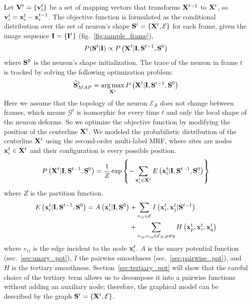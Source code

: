 \documentclass{article}
\DeclareMathOperator*{\argmax}{arg\,max}
\begin{document}
Let ${\bf V}^t = \{{\bf v}_i^t\}$ be a set of mapping vectors that transforms ${\bf X}^{t-1}$ to ${\bf X}^t$, so ${\bf v}_i^t = {\bf x}_i^t - {\bf x}_i^{t-1}$. The objective function is formulated as the conditional distribution over the set of neuron's shape ${\bf S}^t = \{ {\bf X}^t, \mathcal{E} \}$ for each frame, given the image sequence ${\bf I} = \{ {\bf I}^t \}$ (fig.~\ref{fig:sample_frame}),
\begin{equation}
P({\bf S}^t|{\bf I}) \propto P \left( {\bf X}^t | {\bf I}, {\bf S}^{t-1}, {\bf S}^0  \right)
\end{equation}
where ${\bf S}^0$ is the neuron's shape initialization. The trace of the neuron in frame $t$ is tracked by solving the following optimization problem:
\begin{equation} \label{eq:obj}
\widehat{\bf S}^t_{MAP} = \argmax_{{\bf X}^t} P \left( {\bf X}^t | {\bf I}, {\bf S}^{t-1}, {\bf S}^0 \right)
\end{equation}
Here we assume that the topology of the neuron $\mathcal{E}_R$ does not change between frames, which means $\mathcal{G}^t$ is isomorphic for every time $t$ and only the local shape of the neuron deforms. So we optimize the objective function by modifying the position of the centerline ${\bf X}^t$. We modeled the probabilistic distribution of the centerline ${\bf X}^t$ using the second-order multi-label MRF, where sites are nodes ${\bf x}_i^t \in {\bf X}^t$ and their configuration is every possible position. 
\begin{equation}
P \left( {\bf X}^t | {\bf I}, {\bf S}^{t-1}, {\bf S}^0 \right) = \frac{1}{Z} \exp \left\{-\sum_{{\bf x}_i^t \in {\bf X}^t} E\left( {\bf x}_i^t | {\bf I}, {\bf S}^{t-1}, {\bf S}^0 \right) \right\}
\end{equation}
where $Z$ is the partition function.
\begin{equation} \label{eq:objfunc}
\begin{split}
E\left( {\bf x}_i^t | {\bf I}, {\bf S}^{t-1}, {\bf S}^0 \right) = A\left( {\bf x}_i^t | {\bf I}, {\bf S}^0 \right) & + \sum_{e_{ij} \in \mathcal{E}} I\left({\bf x}_i^t,{\bf x}_j^t | {\bf S}^{t-1}\right) \\
&+ \sum_{e_{ip},e_{iq} \in \mathcal{E}_R, p \neq q} H\left({\bf x}_p^t,{\bf x}_i^t,{\bf x}_q^t\right)
\end{split}
\end{equation}
where $e_{ij}$ is the edge incident to the node ${\bf x}_i^t$. $A$ is the unary potential function (sec.~\ref{sec:unary_pot}), $I$ the pairwise smoothness (sec.~\ref{sec:pairwise_pot}), and $H$ is the tertiary smoothness. Section~\ref{sec:tertiary_pot} will show that the careful choice of the tertiary term allows us to decompose it into a pairwise functions without adding an auxiliary node; therefore, the graphical model can be described by the graph ${\bf S}^t = \{ {\bf X}^t, \mathcal{E} \}$.
\end{document}
